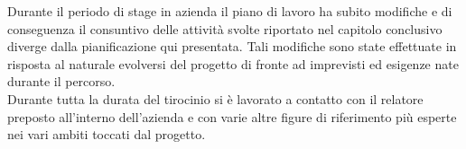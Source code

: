 \begin{comment}
            \hline
            
            80 & 6, 7 &
            \begin{itemize}[leftmargin=*]
                \item Sviluppo della \gls{skill} Alexa per il controllo vocale e l'aggiornamento dei risultati;
                \item Integrazione con la piattaforma esistente. 
            \end{itemize}  \\
            
            \hline
            
            40 & 8 &
            \begin{itemize}[leftmargin=*]
                \item Testing e stesura della documentazione di progetto delle attività di sviluppo condotte nelle settimane precedenti.
            \end{itemize} \\
            
            \hline
            
            \multicolumn{2}{ | c | }{\textbf{Totale ore: }} &   \multicolumn{1}{  c | }{\textbf{320}}\\
            
            \hline
        
            
            \caption{Pianificazione delle attività}\label{tab:pianificazione}
        \end{longtable}
        
    
\end{center}

\end{comment}

Durante il periodo di stage in azienda il piano di lavoro ha subito modifiche e di conseguenza il consuntivo delle attività svolte riportato nel capitolo conclusivo diverge dalla pianificazione qui presentata. Tali modifiche sono state effettuate in risposta al naturale evolversi del progetto di fronte ad imprevisti ed esigenze nate durante il percorso. \\
Durante tutta la durata del tirocinio si è lavorato a contatto con il relatore preposto all'interno dell'azienda e con varie altre figure di riferimento più esperte nei vari ambiti toccati dal progetto.